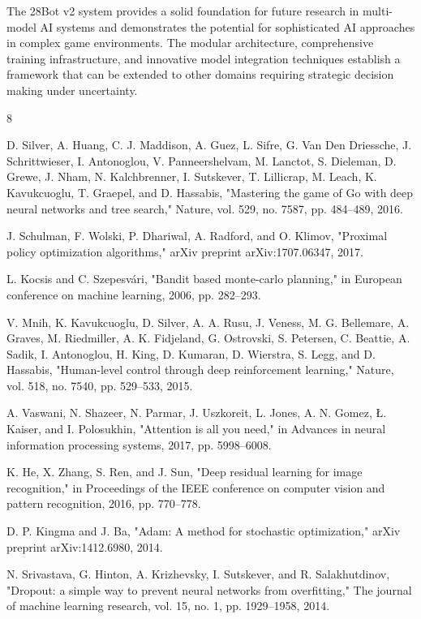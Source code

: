\documentclass[conference]{IEEEtran}
\begin{document}
The 28Bot v2 system provides a solid foundation for future research in multi-model AI systems and demonstrates the potential for sophisticated AI approaches in complex game environments. The modular architecture, comprehensive training infrastructure, and innovative model integration techniques establish a framework that can be extended to other domains requiring strategic decision making under uncertainty.

\begin{thebibliography}{8}

D. Silver, A. Huang, C. J. Maddison, A. Guez, L. Sifre, G. Van Den Driessche, J. Schrittwieser, I. Antonoglou, V. Panneershelvam, M. Lanctot, S. Dieleman, D. Grewe, J. Nham, N. Kalchbrenner, I. Sutskever, T. Lillicrap, M. Leach, K. Kavukcuoglu, T. Graepel, and D. Hassabis, "Mastering the game of Go with deep neural networks and tree search," Nature, vol. 529, no. 7587, pp. 484--489, 2016.

J. Schulman, F. Wolski, P. Dhariwal, A. Radford, and O. Klimov, "Proximal policy optimization algorithms," arXiv preprint arXiv:1707.06347, 2017.

L. Kocsis and C. Szepesvári, "Bandit based monte-carlo planning," in European conference on machine learning, 2006, pp. 282--293.

V. Mnih, K. Kavukcuoglu, D. Silver, A. A. Rusu, J. Veness, M. G. Bellemare, A. Graves, M. Riedmiller, A. K. Fidjeland, G. Ostrovski, S. Petersen, C. Beattie, A. Sadik, I. Antonoglou, H. King, D. Kumaran, D. Wierstra, S. Legg, and D. Hassabis, "Human-level control through deep reinforcement learning," Nature, vol. 518, no. 7540, pp. 529--533, 2015.

A. Vaswani, N. Shazeer, N. Parmar, J. Uszkoreit, L. Jones, A. N. Gomez, Ł. Kaiser, and I. Polosukhin, "Attention is all you need," in Advances in neural information processing systems, 2017, pp. 5998--6008.

K. He, X. Zhang, S. Ren, and J. Sun, "Deep residual learning for image recognition," in Proceedings of the IEEE conference on computer vision and pattern recognition, 2016, pp. 770--778.

D. P. Kingma and J. Ba, "Adam: A method for stochastic optimization," arXiv preprint arXiv:1412.6980, 2014.

N. Srivastava, G. Hinton, A. Krizhevsky, I. Sutskever, and R. Salakhutdinov, "Dropout: a simple way to prevent neural networks from overfitting," The journal of machine learning research, vol. 15, no. 1, pp. 1929--1958, 2014.

\end{thebibliography}
\end{document}
